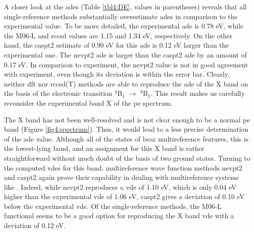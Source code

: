 \begin{refsection}
A closer look at the \acrshort{ade}s (Table \ref{tbl4:DE}, values in parentheses) reveals that all single-reference methods substantially overestimate \acrshort{ade}s in comparison to the experimental value. To be more detailed, the experimental \acrshort{ade} is 0.78 eV, while the M06-L and \acrshort{rccsd} values are 1.15 and 1.34 eV, respectively. On the other hand, the \acrshort{caspt2} estimate of 0.90 eV for this \acrshort{ade} is 0.12 eV larger than the experimental one. The \acrshort{nevpt2} \acrshort{ade} is larger than the \acrshort{caspt2} \acrshort{ade} by an amount of 0.17 eV. In comparison to experiment, the \acrshort{nevpt2} value is not in good agreement with experiment, even though its deviation is within the error bar. Clearly, neither \acrshort{dft} nor \acrshort{rccsd}(T) methods are able to reproduce the \acrshort{ade} of the X band on the basis of the electronic transition $^4$B$_1$ $\longrightarrow$ $^3$B$_1$. This result makes us carefully reconsider the experimental band X of the \acrshort{pe} spectrum.




The X band has not been well-resolved and is not clear enough to be a normal \acrshort{pe} band (Figure \ref{fig4:spectrum}). Thus, it would lead to a less precise determination of the \acrshort{ade} value. Although all of the states of  bear multireference features, this is the lowest-lying band, and an assignment for this X band is rather straightforward without much doubt of the basis of two ground states. Turning to the computed \acrshort{vde}s for this band, multireference wave function methods \acrshort{nevpt2} and \acrshort{caspt2} again prove their capability in dealing with multireference systems like . Indeed, while \acrshort{nevpt2} reproduces a \acrshort{vde} of 1.10 eV, which is only 0.04 eV higher than the experimental \acrshort{vde} of 1.06 eV, \acrshort{caspt2} gives a deviation of 0.10 eV below the experimental \acrshort{vde}. Of the single-reference methods, the M06-L functional seems to be a good option for reproducing the X band \acrshort{vde} with a deviation of 0.12 eV. 






\end{refsection}
